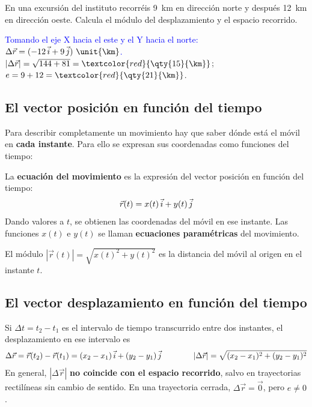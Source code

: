 \begin{exercise}
    En una excursión del instituto recorréis \qty{9}{\km} en dirección norte y después \qty{12}{\km} en dirección oeste. Calcula
    el módulo del desplazamiento y el espacio recorrido.
    \begin{solu}
        \textcolor{blue}{Tomando el eje X hacia el este y el Y hacia el norte: \(\Delta\vec r = (-12\,\ivec + 9\,\jvec)~\unit{\km}\).}
        \(|\Delta\vec r| = \sqrt{144 + 81} = \textcolor{red}{\qty{15}{\km}}\); \(e = 9 + 12 = \textcolor{red}{\qty{21}{\km}}\).
    \end{solu}
\end{exercise}

\subsection{El vector posición en función del tiempo}

Para describir completamente un movimiento hay que saber dónde está el móvil en \textbf{cada instante}. Para ello se expresan sus
coordenadas como funciones del tiempo:

\begin{definition}
    La \textbf{ecuación del movimiento} es la expresión del vector posición en función del tiempo:
    \[ \vec r(t) = x(t)\,\vec{i} + y(t)\,\vec{j} \]
    Dando valores a \(t\), se obtienen las coordenadas del móvil en ese instante. Las funciones \(x(t)\) e \(y(t)\) se llaman
    \textbf{ecuaciones paramétricas} del movimiento.
\end{definition}

El módulo \(|\vec r(t)| = \sqrt{x(t)^2 + y(t)^2}\) es la distancia del móvil al origen en el instante \(t\).

\subsection{El vector desplazamiento en función del tiempo}

Si \(\Delta t = t_2 - t_1\) es el intervalo de tiempo transcurrido entre dos instantes, el desplazamiento en ese intervalo es
\[ \Delta\vec r = \vec r(t_2) - \vec r(t_1) = (x_2 - x_1)\,\vec{i} + (y_2 - y_1)\,\vec{j} \qquad\qquad
   |\Delta\vec r| = \sqrt{(x_2 - x_1)^2 + (y_2 - y_1)^2} \]
En general, \(|\Delta\vec r|\) \textbf{no coincide con el espacio recorrido}, salvo en trayectorias rectilíneas sin cambio de
sentido. En una trayectoria cerrada, \(\Delta\vec r = \vec 0\), pero \(e \neq 0\).

